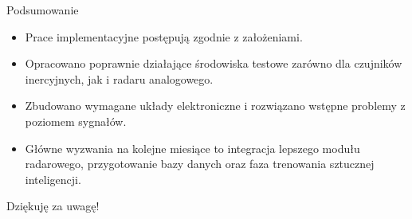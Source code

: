 \documentclass{beamer}
\begin{document}
\begin{frame}{Podsumowanie}
    \begin{itemize}
        \item Prace implementacyjne postępują zgodnie z założeniami.
        \item Opracowano poprawnie działające środowiska testowe zarówno dla czujników inercyjnych, jak i radaru analogowego.
        \item Zbudowano wymagane układy elektroniczne i rozwiązano wstępne problemy z poziomem sygnałów.
        \item Główne wyzwania na kolejne miesiące to integracja lepszego modułu radarowego, przygotowanie bazy danych oraz faza trenowania sztucznej inteligencji.
    \end{itemize}
    
    \vspace{1cm}
    \begin{center}
        \Large Dziękuję za uwagę!
    \end{center}
\end{frame}
\end{document}
